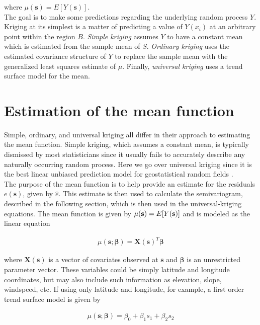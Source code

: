 \documentclass[12pt,twoside]{reedthesis}
\begin{document}
where $\mu(\mathbf{s}) = E[Y(\mathbf{s})]$.
  \\

The goal is to make some predictions regarding the underlying random process $Y$. Kriging at its simplest is a matter of predicting a value of $Y(x_i)$ at an arbitrary point within the region $B$. \emph{Simple kriging} assumes $Y$ to have a constant mean which is estimated from the sample mean of $S$. \emph{Ordinary kriging} uses the estimated covariance structure of $Y$ to replace the sample mean with the generalized least squares estimate of $\mu$. Finally, \emph{universal kriging} uses a trend surface model for the mean. 

\section{Estimation of the mean function}

Simple, ordinary, and universal kriging all differ in their approach to estimating the mean function. Simple kriging, which assumes a constant mean, is typically dismissed by most statisticians since it usually fails to accurately describe any naturally occurring random process. Here we go over universal kriging since it is the best linear unbiased prediction model for geostatistical random fields \cite{gelfand:2010}. \\

The purpose of the mean function is to help provide an estimate for the residuals $e(\mathbf{s})$, given by $\hat e$. This estimate is then used to calculate the semivariogram, described in the following section, which is then used in the universal-kriging equations. The mean function is given by $\mu(\mathbf{s}) = E[Y(\bold{s})]$ and is modeled as the linear equation

\begin{align*}
\mu(\mathbf{s}; \mathbf{\beta}) = \mathbf{X}(\mathbf{s})^T \mathbf{\beta}
\end{align*} 

where $\mathbf{X}(\mathbf{s})$ is a vector of covariates observed at $\mathbf{s}$ and $\mathbf{\beta}$ is an unrestricted parameter vector. These variables could be simply latitude and longitude coordinates, but may also include such information as elevation, slope, windspeed, etc. If using only latitude and longitude, for example, a first order  trend surface model is given by

\begin{align*}
\mu(\mathbf{s}; \mathbf{\beta}) = \beta_0 + \beta_1s_1 + \beta_2s_2
\end{align*} 
\end{document}
